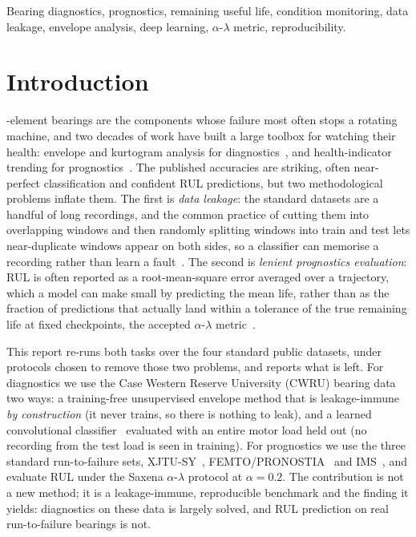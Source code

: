 \documentclass[journal]{IEEEtran}
\begin{document}
\begin{IEEEkeywords}
Bearing diagnostics, prognostics, remaining useful life, condition monitoring, data leakage, envelope analysis,
deep learning, $\alpha$-$\lambda$ metric, reproducibility.
\end{IEEEkeywords}

\section{Introduction}

-element bearings are the components whose failure most often stops a rotating machine,
and two decades of work have built a large toolbox for watching their health: envelope and kurtogram analysis for
diagnostics~\cite{randall,antoni}, and health-indicator trending for prognostics~\cite{lei}. The published
accuracies are striking, often near-perfect classification and confident RUL predictions, but two methodological
problems inflate them. The first is \emph{data leakage}: the standard datasets are a handful of long recordings,
and the common practice of cutting them into overlapping windows and then randomly splitting windows into train
and test lets near-duplicate windows appear on both sides, so a classifier can memorise a recording rather than
learn a fault~\cite{smith}. The second is \emph{lenient prognostics evaluation}: RUL is often reported as a
root-mean-square error averaged over a trajectory, which a model can make small by predicting the mean life,
rather than as the fraction of predictions that actually land within a tolerance of the true remaining life at
fixed checkpoints, the accepted $\alpha$-$\lambda$ metric~\cite{saxena}.

This report re-runs both tasks over the four standard public datasets, under protocols chosen to remove those two
problems, and reports what is left. For diagnostics we use the Case Western Reserve University (CWRU) bearing
data~\cite{smith} two ways: a training-free unsupervised envelope method that is leakage-immune \emph{by
construction} (it never trains, so there is nothing to leak), and a learned convolutional classifier~\cite{zhang}
evaluated with an entire motor load held out (no recording from the test load is seen in training). For
prognostics we use the three standard run-to-failure sets, XJTU-SY~\cite{wang}, FEMTO/PRONOSTIA~\cite{nectoux}
and IMS~\cite{qiu}, and evaluate RUL under the Saxena $\alpha$-$\lambda$ protocol at $\alpha=0.2$. The
contribution is not a new method; it is a leakage-immune, reproducible benchmark and the finding it
yields: diagnostics on these data is largely solved, and RUL prediction on real run-to-failure bearings is not.
\end{document}
